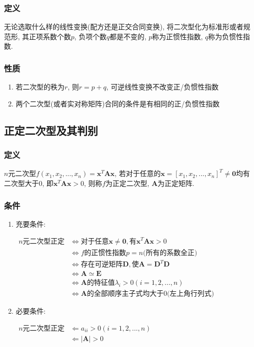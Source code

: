 \subsubsection{定义}
无论选取什么样的线性变换(配方还是正交合同变换), 将二次型化为标准形或者规范形, 其正项系数个数$ p $, 负项个数$ q $都是不变的, $ p $称为正惯性指数, $ q $称为负惯性指数.
\subsubsection{性质}
\begin{enumerate}
	\item 若二次型的秩为$ r $, 则$ r=p+q $, 可逆线性变换不改变正/负惯性指数
	\item 两个二次型(或者实对称矩阵)合同的条件是有相同的正/负惯性指数
\end{enumerate}
\subsection{正定二次型及其判别}
\subsubsection{定义}
$ n $元二次型$ f(x_{1}, x_{2},... ,x_{n})=\bm{x}^{T}\bm{A}\bm{x} $, 若对于任意的$ \bm{x}=[x_{1},x_{2},... ,x_{n}]^{T}\neq \bm{0} $均有二次型大于0, 即$ \bm{x}^{T}\bm{A}\bm{x}>0 $, 则称$ f $为正定二次型, $ \bm{A} $为正定矩阵.
\subsubsection{条件}
\begin{enumerate}
	\item 充要条件: \par $ \begin{aligned}
		n\text{元二次型正定} & \Leftrightarrow \text{对于任意}\bm{x}\neq \bm{0}, \text{有}\bm{x}^{T}\bm{A}\bm{x}>0 \\
		& \Leftrightarrow f\text{的正惯性指数} p=n\text{(所有的系数全正)} \\
		& \Leftrightarrow \text{存在可逆矩阵} \bm{D}, \text{使} \bm{A}=\bm{D}^{T}\bm{D} \\
		& \Leftrightarrow \bm{A}\simeq \bm{E} \\
		& \Leftrightarrow \bm{A}\text{的特征值} \lambda_{i}>0(i=1, 2,... ,n) \\
		& \Leftrightarrow \bm{A}\text{的全部顺序主子式均大于0(左上角行列式)}
	\end{aligned} $
	\item 必要条件: \par $ \begin{aligned}
		n\text{元二次型正定} & \Leftarrow a_{ii}>0(i=1, 2,... ,n) \\
		& \Leftarrow \left|\bm{A}\right|>0 
	\end{aligned} $
\end{enumerate}
